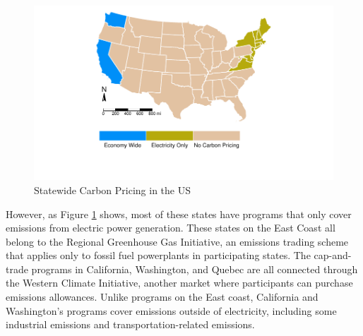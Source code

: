 \begin{figure}
    \centering
    \caption{Statewide Carbon Pricing in the US\label{cap_states}}
    \includegraphics[width = \textwidth]{figures/chapter3_figures/cap_programs.pdf}
    \vspace*{-1.8cm}
\end{figure}

However, as Figure \ref{cap_states} shows, most of these states have programs that only cover emissions from electric power generation. These states on the East Coast all belong to the Regional Greenhouse Gas Initiative, an emissions trading scheme that applies only to fossil fuel powerplants in participating states. The cap-and-trade programs in California, Washington, and Quebec are all connected through the Western Climate Initiative, another market where participants can purchase emissions allowances. Unlike programs on the East coast, California and Washington's programs cover emissions outside of electricity, including some industrial emissions and transportation-related emissions. 

